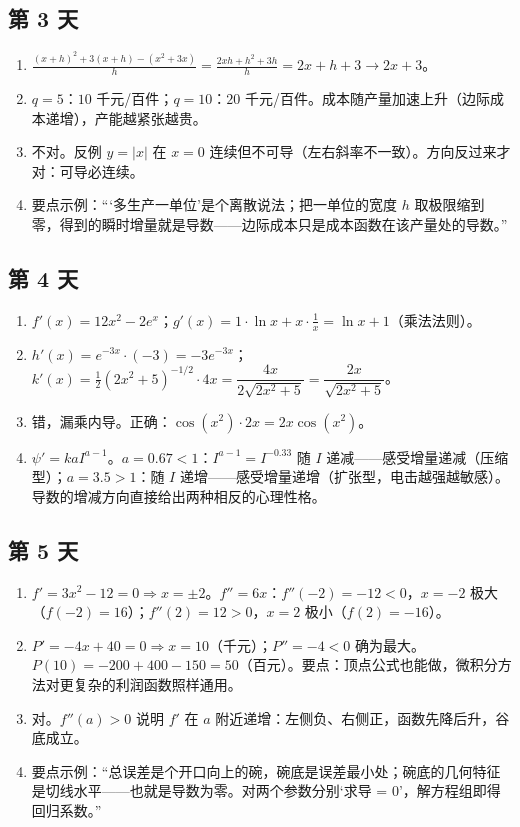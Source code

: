 \documentclass[UTF8,a4paper,11pt]{ctexart}
\begin{document}
\subsection*{第 3 天}
\begin{enumerate}
  \item $\tfrac{(x+h)^2+3(x+h)-(x^2+3x)}{h}=\tfrac{2xh+h^2+3h}{h}=2x+h+3\to 2x+3$。
  \item $q=5$：$10$ 千元/百件；$q=10$：$20$ 千元/百件。成本随产量加速上升（边际成本递增），产能越紧张越贵。
  \item 不对。反例 $y=|x|$ 在 $x=0$ 连续但不可导（左右斜率不一致）。方向反过来才对：可导必连续。
  \item 要点示例：“‘多生产一单位’是个离散说法；把一单位的宽度 $h$ 取极限缩到零，得到的瞬时增量就是导数——边际成本只是成本函数在该产量处的导数。”
\end{enumerate}

\subsection*{第 4 天}
\begin{enumerate}
  \item $f'(x)=12x^2-2e^x$；$g'(x)=1\cdot\ln x+x\cdot\tfrac1x=\ln x+1$（乘法法则）。
  \item $h'(x)=e^{-3x}\cdot(-3)=-3e^{-3x}$；$k'(x)=\tfrac12(2x^2+5)^{-1/2}\cdot4x=\dfrac{4x}{2\sqrt{2x^2+5}}=\dfrac{2x}{\sqrt{2x^2+5}}$。
  \item 错，漏乘内导。正确：$\cos(x^2)\cdot2x=2x\cos(x^2)$。
  \item $\psi'=kaI^{a-1}$。$a=0.67<1$：$I^{a-1}=I^{-0.33}$ 随 $I$ 递减——感受增量递减（压缩型）；$a=3.5>1$：随 $I$ 递增——感受增量递增（扩张型，电击越强越敏感）。导数的增减方向直接给出两种相反的心理性格。
\end{enumerate}

\subsection*{第 5 天}
\begin{enumerate}
  \item $f'=3x^2-12=0\Rightarrow x=\pm2$。$f''=6x$：$f''(-2)=-12<0$，$x=-2$ 极大（$f(-2)=16$）；$f''(2)=12>0$，$x=2$ 极小（$f(2)=-16$）。
  \item $P'=-4x+40=0\Rightarrow x=10$（千元）；$P''=-4<0$ 确为最大。$P(10)=-200+400-150=50$（百元）。要点：顶点公式也能做，微积分方法对更复杂的利润函数照样通用。
  \item 对。$f''(a)>0$ 说明 $f'$ 在 $a$ 附近递增：左侧负、右侧正，函数先降后升，谷底成立。
  \item 要点示例：“总误差是个开口向上的碗，碗底是误差最小处；碗底的几何特征是切线水平——也就是导数为零。对两个参数分别‘求导 = 0’，解方程组即得回归系数。”
\end{enumerate}
\end{document}

